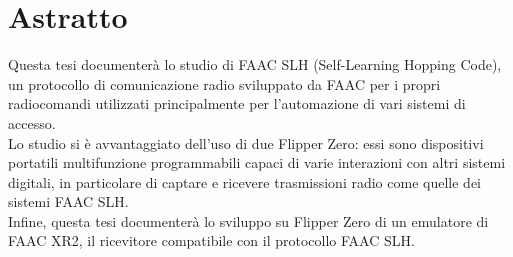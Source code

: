 \chapter*{Astratto}
\label{cha:abstract}
\vspace{1 cm}

Questa tesi documenterà lo studio di FAAC SLH (Self-Learning Hopping Code), un protocollo di comunicazione radio sviluppato da FAAC per i propri radiocomandi utilizzati principalmente per l’automazione di vari sistemi di accesso.\\
Lo studio si è avvantaggiato dell’uso di due Flipper Zero: essi sono dispositivi portatili multifunzione programmabili capaci di varie interazioni con altri sistemi digitali, in particolare di captare e ricevere trasmissioni radio come quelle dei sistemi FAAC SLH.\\
Infine, questa tesi documenterà lo sviluppo su Flipper Zero di un emulatore di FAAC XR2, il ricevitore compatibile con il protocollo FAAC SLH.\\
